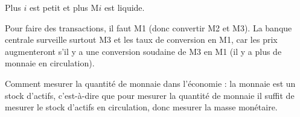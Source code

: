 	Plus $i$ est petit et plus M$i$ est liquide.
	
	Pour faire des transactions, il faut M1 (donc convertir M2 et M3). La banque centrale surveille surtout M3 et les taux de conversion en M1, car les prix augmenteront s'il y a une conversion soudaine de M3 en M1 (il y a plus de monnaie en circulation).
	
	Comment mesurer la quantité de monnaie dans l'économie : la monnaie est un stock d'actifs, c'est-à-dire que pour mesurer la quantité de monnaie il suffit de mesurer le stock d'actifs en circulation, donc mesurer la masse monétaire.